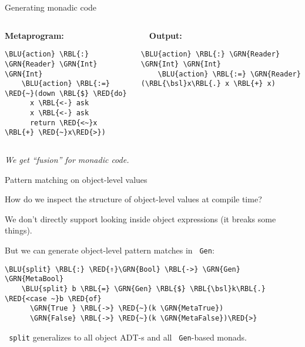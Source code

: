 \documentclass[dvipsnames,aspectratio=169]{beamer}
\theoremstyle{remark}
\newcommand{\RED}[1]{{\color{BrickRed} #1}}
\newcommand{\GRN}[1]{{\color{OliveGreen} #1}}
\newcommand{\RBL}[1]{{\color{RoyalBlue} #1}}
\newcommand{\BLU}[1]{{\color{Blue} #1}}
\newcommand{\bsl}{\textbackslash}
\begin{document}
\begin{frame}[fragile]{Generating monadic code}

\begin{columns}
\begin{column}{0.4\textwidth}
\textbf{Metaprogram:}
\begin{Verbatim}[commandchars=\\\{\}]
    \BLU{action} \RBL{:} \GRN{Reader} \GRN{Int} \GRN{Int}
    \BLU{action} \RBL{:=} \RED{~}(down \RBL{$} \RED{do}
      x \RBL{<-} ask
      x \RBL{<-} ask
      return \RED{<~}x \RBL{+} \RED{~}x\RED{>})
\end{Verbatim}
\end{column}

\begin{column}{0.5\textwidth}
\textbf{$\hspace{1em}$Output:}
\begin{Verbatim}[commandchars=\\\{\}]
    \BLU{action} \RBL{:} \GRN{Reader} \GRN{Int} \GRN{Int}
    \BLU{action} \RBL{:=} \GRN{Reader} (\RBL{\bsl}x\RBL{.} x \RBL{+} x)



\end{Verbatim}
\end{column}
\end{columns}
\vspace{2em}

\emph{We get ``fusion'' for monadic code.}

\end{frame}

\begin{frame}[fragile]{Pattern matching on object-level values}

How do we inspect the structure of object-level values at compile time?
\vspace{1em}

We don't directly support looking inside object expressions (it breaks some things).
\vspace{1em}

But we can generate object-level pattern matches in \texttt{\GRN{Gen}}:
\vspace{0.5em}
\begin{Verbatim}[commandchars=\\\{\}]
    \BLU{split} \RBL{:} \RED{⇑}\GRN{Bool} \RBL{->} \GRN{Gen} \GRN{MetaBool}
    \BLU{split} b \RBL{=} \GRN{Gen} \RBL{$} \RBL{\bsl}k\RBL{.} \RED{<case ~}b \RED{of}
      \GRN{True } \RBL{->} \RED{~}(k \GRN{MetaTrue})
      \GRN{False} \RBL{->} \RED{~}(k \GRN{MetaFalse})\RED{>}
\end{Verbatim}

\vspace{1em}
\texttt{\BLU{split}} generalizes to all object ADT-s and all \texttt{\GRN{Gen}}-based monads.

\end{frame}
\end{document}
